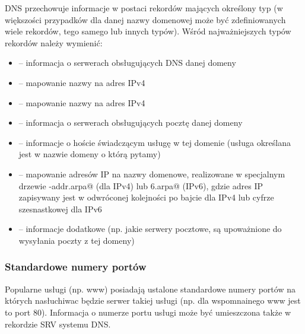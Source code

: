 DNS przechowuje informacje w postaci rekordów mających określony typ (w większości przypadków dla danej nazwy domenowej może być zdefiniowanych wiele rekordów, tego samego lub innych typów).
Wśród najważniejszych typów rekordów należy wymienić:
\begin{itemize}
	\item \Verb@NS@   – informacja o serwerach obsługujących DNS danej domeny
	\item \Verb@A@    – mapowanie nazwy na adres IPv4
	\item \Verb@AAAA@ – mapowanie nazwy na adres IPv4
	\item \Verb@MX@   – informacja o serwerach obsługujących pocztę danej domeny
	\item \Verb@SRV@  – informacje o hoście świadczącym usługę w tej domenie (usługa określana jest w nazwie domeny o którą pytamy)
	\item \Verb@PTR@  – mapowanie adresów IP na nazwy domenowe, realizowane w specjalnym drzewie \Verb@in-addr.arpa@ (dla IPv4) lub \Verb@ip6.arpa@ (IPv6),
	                    gdzie adres IP zapisywany jest w odwróconej kolejności po bajcie dla IPv4 lub cyfrze szesnastkowej dla IPv6
	\item \Verb@TXT@  – informacje dodatkowe (np. jakie serwery pocztowe, są upoważnione do wysyłania poczty z tej domeny)
\end{itemize}

\subsubsection{Standardowe numery portów}

Popularne usługi (np. www) posiadają ustalone standardowe numery portów na których nasłuchiwac będzie serwer takiej usługi (np. dla wspomnainego www jest to port 80). Informacja o numerze portu usługi może być umieszczona także w rekordzie SRV systemu DNS.

